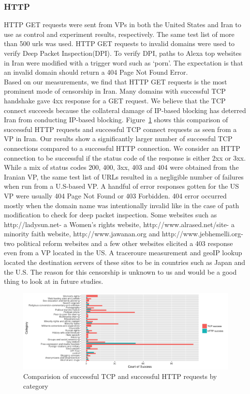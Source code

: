 \subsubsection{HTTP}
 HTTP GET requests were sent from VPs in both the United States and Iran to use as control and experiment results, respectively. The same test list of more than 500 urls was used. HTTP GET requests to invalid domains were used to verify Deep Packet Inspection(DPI). To verify DPI, paths to Alexa top websites in Iran were modified with a trigger word such as `porn'. The expectation is that an invalid domain should return a 404 Page Not Found Error.\\
Based on our measurements, we find that HTTP GET requests is the most prominent mode of censorship in Iran. Many domains with successful TCP handshake gave 4xx response for a GET request. We believe that the TCP connect succeeds because the collateral damage of IP-based blocking has deterred Iran from conducting IP-based blocking. Figure~\ref{fig:TCPcomapreHTTP} shows this comparison of successful HTTP requests and successful TCP connect requests as seen from a VP in Iran. Our results show a significantly larger number of successful TCP connections compared to a successful HTTP connection. We consider an HTTP connection to be successful if the status code of the response is either 2xx or 3xx.\\
While a mix of status codes 200, 400, 3xx, 403 and 404 were obtained from the Iranian VP, the same test list of URLs resulted in a negligible number of failures when run from a U.S-based VP. A handful of error responses gotten for the US VP were usually 404 Page Not Found or 403 Forbidden. 404 error occurred mostly when the domain name was intentionally invalid like in the case of path modification to check for deep packet inspection. Some websites such as http://ladysun.net- a Women's rights website, http://www.alrased.net/site- a minority faith website, http://www.jawanan.org and http://www.jebhemelli.org- two political reform websites and a few other websites elicited a 403 response even from a VP located in the US. A traceroure measurement and geoIP lookup located the destination servers of these sites to be in countries such as Japan and the U.S. The reason for this censorship is unknown to us and would be a good thing to look at in future studies.\\
\begin{figure}
 \centerline{\includegraphics[width=.9\textwidth,keepaspectratio]{pictures/TCPcompareHTTP.png}}
  \caption{Comparision of successful TCP and successful HTTP requests by category}
  \label{fig:TCPcomapreHTTP}
\end{figure}

